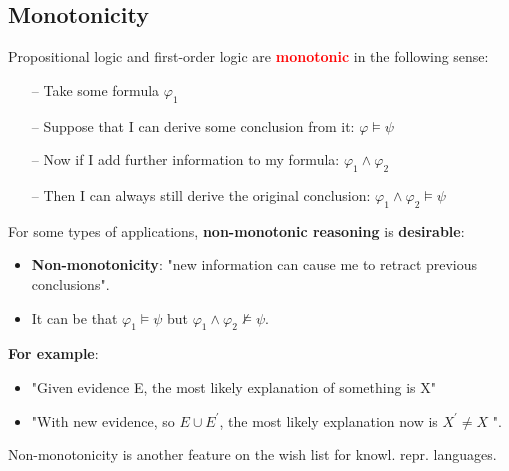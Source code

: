 \subsection{Monotonicity}
Propositional logic and first-order logic are \textbf{\textcolor{red}{monotonic}} in the following sense:
\begin{itemize}
    \item[--] Take some formula $\varphi_1$
    \item[--] Suppose that I can derive some conclusion from it: $\varphi \models \psi$
    \item[--] Now if I add further information to my formula: $\varphi_1 \wedge \varphi_2$
    \item[--] Then I can always still derive the original conclusion: $\varphi_1 \wedge \varphi_2 \models \psi$
\end{itemize}

For some types of applications, \textbf{non-monotonic reasoning} is \textbf{desirable}:
\begin{itemize}
    \item \textbf{\textcolor{PineGreen}{Non-monotonicity}}: "new information can cause me to retract previous conclusions".
    \item It can be that $\varphi_1 \models \psi$ but $\varphi_1 \wedge \varphi_2 \not \models \psi$.
\end{itemize}

\textbf{For example}:
\begin{itemize}
    \item "Given evidence E, the most likely explanation of something is X"
    \item "With new evidence, so $E \cup E^\prime $, the most likely explanation now is $X^\prime \neq X$ ".
\end{itemize}

Non-monotonicity is another feature on the wish list for knowl. repr. languages.